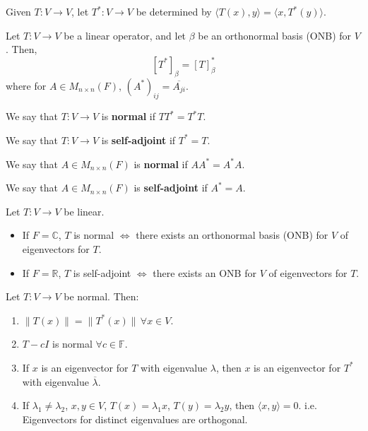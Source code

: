 \documentclass{article}
\begin{document}
\begin{definition}
Given \( T: V \to V \), let \( T^*: V \to V \) be determined by \( \langle T(x), y \rangle = \langle x, T^*(y) \rangle \).
\end{definition}



\begin{theorem}
Let \( T: V \to V \) be a linear operator, and let \( \beta \) be an orthonormal basis (ONB) for \( V \). Then,
\[
[T^*]_\beta = [T]_\beta^*
\]
where for \( A \in M_{n \times n}(F) \), \( (A^*)_{ij} = \overline{A_{ji}} \).
\end{theorem}


\begin{definition}
We say that \( T: V \to V \) is \textbf{normal} if \( T T^* = T^* T \).

We say that \( T: V \to V \) is \textbf{self-adjoint} if \( T^* = T \).

We say that \( A \in M_{n \times n}(F) \) is \textbf{normal} if \( A A^* = A^* A \).

We say that \( A \in M_{n \times n}(F) \) is \textbf{self-adjoint} if \( A^* = A \).
\end{definition}



\begin{theorem}
Let \( T: V \to V \) be linear.
\begin{itemize}
    \item If \( F = \mathbb{C} \), \( T \) is normal \(\iff\) there exists an orthonormal basis (ONB) for \( V \) of eigenvectors for \( T \).
    \item If \( F = \mathbb{R} \), \( T \) is self-adjoint \(\iff\) there exists an ONB for \( V \) of eigenvectors for \( T \).
\end{itemize}
\end{theorem}



\begin{theorem}
Let \( T: V \to V \) be normal. Then:
\begin{enumerate}
    \item \( \|T(x)\| = \|T^*(x)\| \, \forall x \in V \).
    \item \( T - cI \) is normal \( \forall c \in \mathbb{F} \).
    \item If \( x \) is an eigenvector for \( T \) with eigenvalue \( \lambda \), then \( x \) is an eigenvector for \( T^* \) with eigenvalue \( \overline{\lambda} \).
    \item If \( \lambda_1 \neq \lambda_2 \), \( x, y \in V \), \( T(x) = \lambda_1 x \), \( T(y) = \lambda_2 y \), then \( \langle x, y \rangle = 0 \). i.e. Eigenvectors for distinct eigenvalues are orthogonal.
\end{enumerate}
\end{theorem}
\end{document}
